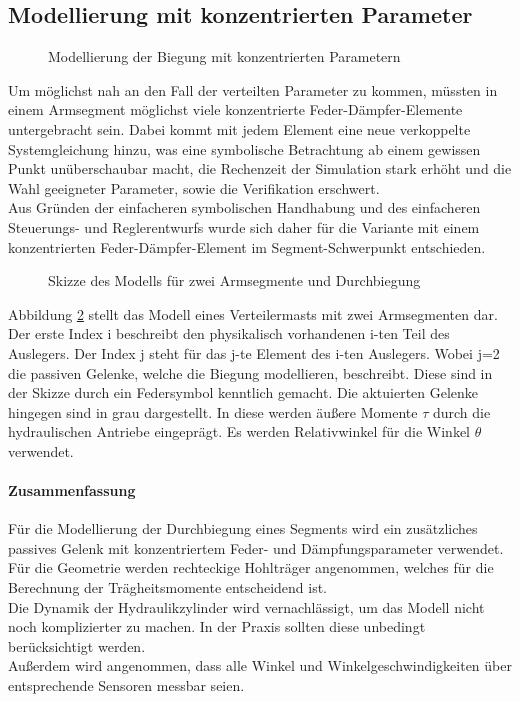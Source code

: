 \subsection{Modellierung mit konzentrierten Parameter}
\begin{figure}[!h]
\centering
\def\svgscale{0.8}

\caption{Modellierung der Biegung mit konzentrierten Parametern}
\label{fig:KonzPara}
\end{figure}

Um möglichst nah an den Fall der verteilten Parameter zu kommen, müssten in einem Armsegment möglichst viele konzentrierte Feder-Dämpfer-Elemente untergebracht sein. Dabei kommt mit jedem Element eine neue verkoppelte Systemgleichung hinzu, was eine symbolische Betrachtung ab einem gewissen Punkt unüberschaubar macht, die Rechenzeit der Simulation stark erhöht und die Wahl geeigneter Parameter, sowie die Verifikation erschwert.\\
Aus Gründen der einfacheren symbolischen Handhabung und des einfacheren Steuerungs- und Reglerentwurfs wurde sich daher für die Variante mit einem konzentrierten Feder-Dämpfer-Element im Segment-Schwerpunkt entschieden.
\begin{figure}[h!]
\centering
\def\svgscale{0.8}

\caption{Skizze des Modells für zwei Armsegmente und Durchbiegung}
\label{fig:Skizze}
\end{figure}


Abbildung \ref{fig:Skizze} stellt das Modell eines Verteilermasts mit zwei Armsegmenten dar. Der erste Index i beschreibt den physikalisch vorhandenen i-ten Teil des Auslegers. Der Index j steht für das j-te Element des i-ten Auslegers. Wobei j=2 die passiven Gelenke, welche die Biegung modellieren, beschreibt. Diese sind in der Skizze durch ein Federsymbol kenntlich gemacht. Die aktuierten Gelenke hingegen sind in grau dargestellt. In diese werden äußere Momente $\tau$ durch die hydraulischen Antriebe eingeprägt. Es werden Relativwinkel für die Winkel $\theta$ verwendet.\\

\paragraph{Zusammenfassung}
Für die Modellierung der Durchbiegung eines Segments wird ein zusätzliches passives Gelenk mit konzentriertem Feder- und Dämpfungsparameter verwendet.\\
Für die Geometrie werden rechteckige Hohlträger angenommen, welches für die Berechnung der Trägheitsmomente entscheidend ist.\\
Die Dynamik der Hydraulikzylinder wird vernachlässigt, um das Modell nicht noch komplizierter zu machen. In der Praxis sollten diese unbedingt berücksichtigt werden.\\
Außerdem wird angenommen, dass alle Winkel und Winkelgeschwindigkeiten über entsprechende Sensoren messbar seien.

